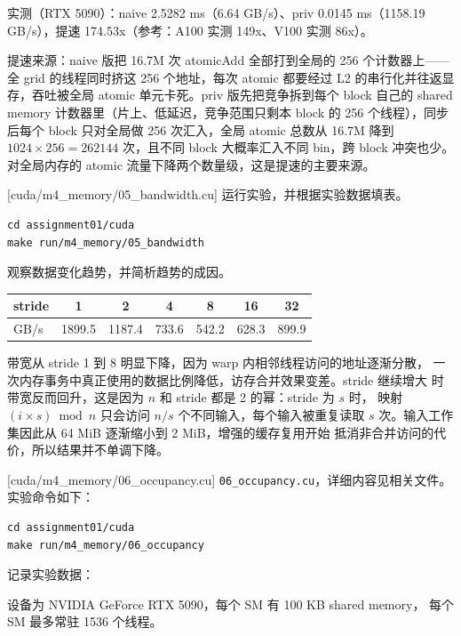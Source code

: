 \documentclass[11pt,a4paper,fontset=none]{ctexart}
\begin{document}
实测（RTX 5090）：naive 2.5282 ms（6.64 GB/s）、priv 0.0145 ms（1158.19 GB/s），提速 174.53x（参考：A100 实测 149x、V100 实测 86x）。

提速来源：naive 版把 16.7M 次 atomicAdd 全部打到全局的 256 个计数器上——全 grid 的线程同时挤这 256 个地址，每次 atomic 都要经过 L2 的串行化并往返显存，吞吐被全局 atomic 单元卡死。priv 版先把竞争拆到每个 block 自己的 shared memory 计数器里（片上、低延迟，竞争范围只剩本 block 的 256 个线程），同步后每个 block 只对全局做 256 次汇入，全局 atomic 总数从 16.7M 降到 $1024 \times 256 = 262144$ 次，且不同 block 大概率汇入不同 bin，跨 block 冲突也少。对全局内存的 atomic 流量下降两个数量级，这是提速的主要来源。

[cuda/m4\_memory/05\_bandwidth.cu]
运行实验，并根据实验数据填表。

\begin{lstlisting}
cd assignment01/cuda
make run/m4_memory/05_bandwidth
\end{lstlisting}

观察数据变化趋势，并简析趋势的成因。

\begin{center}\small
  \begin{tabular}{@{}lcccccc@{}}
    \toprule
    stride & 1      & 2      & 4     & 8     & 16    & 32    \\
    \midrule
    GB/s   & 1899.5 & 1187.4 & 733.6 & 542.2 & 628.3 & 899.9 \\
    \bottomrule
  \end{tabular}
\end{center}

带宽从 stride 1 到 8 明显下降，因为 warp 内相邻线程访问的地址逐渐分散，
一次内存事务中真正使用的数据比例降低，访存合并效果变差。stride 继续增大
时带宽反而回升，这是因为 $n$ 和 stride 都是 2 的幂：stride 为 $s$ 时，
映射 $(i\times s)\bmod n$ 只会访问 $n/s$ 个不同输入，每个输入被重复读取
$s$ 次。输入工作集因此从 64 MiB 逐渐缩小到 2 MiB，增强的缓存复用开始
抵消非合并访问的代价，所以结果并不单调下降。

[cuda/m4\_memory/06\_occupancy.cu]
\texttt{06\_occupancy.cu}，详细内容见相关文件。实验命令如下：

\begin{lstlisting}
cd assignment01/cuda
make run/m4_memory/06_occupancy
\end{lstlisting}

记录实验数据：

设备为 NVIDIA GeForce RTX 5090，每个 SM 有 100 KB shared memory，
每个 SM 最多常驻 1536 个线程。
\end{document}
